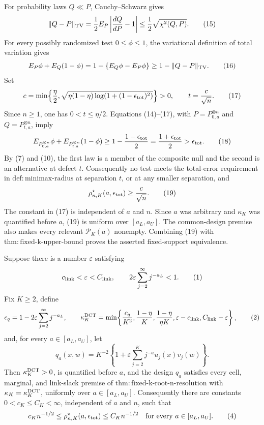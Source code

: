 For probability laws \(Q\ll P\), Cauchy--Schwarz gives
\[
\|Q-P\|_{\rm TV}
=\frac12E_P\left|\frac{dQ}{dP}-1\right|
\le\frac12\sqrt{\chi^2(Q,P)}.
\tag{15}
\]
For every possibly randomized test \(0\le\phi\le1\), the variational definition of total variation gives
\[
E_P\phi+E_Q(1-\phi)
=1-\{E_Q\phi-E_P\phi\}
\ge1-\|Q-P\|_{\rm TV}.
\tag{16}
\]
Set
\[
c=\min\!\left\{\frac\eta2,
\sqrt{\eta(1-\eta)\log\!\left(1+(1-\epsilon_{\rm tot})^2\right)}\right\}>0,
\qquad
t=\frac{c}{\sqrt n}.
\tag{17}
\]
Since \(n\ge1\), one has \(0<t\le\eta/2\). Equations (14)--(17), with \(P=P_{0,a}^{\otimes n}\) and \(Q=P_{t,a}^{\otimes n}\), imply
\[
E_{P_{0,a}^{\otimes n}}\phi+E_{P_{t,a}^{\otimes n}}(1-\phi)
\ge1-\frac{1-\epsilon_{\rm tot}}2
=\frac{1+\epsilon_{\rm tot}}2
>\epsilon_{\rm tot}.
\tag{18}
\]
By (7) and (10), the first law is a member of the composite null and the second is an alternative at defect \(t\). Consequently no test meets the total-error requirement in \(\mathrm{def:minimax\mbox{-}radius}\) at separation \(t\), or at any smaller separation, and
\[
\rho^\star_{n,K}(a,\epsilon_{\rm tot})\ge\frac{c}{\sqrt n}.
\tag{19}
\]
The constant in (17) is independent of \(a\) and \(n\). Since \(a\) was arbitrary and \(\kappa_K\) was quantified before \(a\), (19) is uniform over \([a_L,a_U]\). The common-design premise also makes every relevant \(\mathcal P_K(a)\) nonempty. Combining (19) with \(\mathrm{thm:fixed\mbox{-}k\mbox{-}upper\mbox{-}bound}\) proves the asserted fixed-support equivalence.

Suppose there is a number \(\varepsilon\) satisfying
\[
c_{\rm link}<\varepsilon<C_{\rm link},
\qquad
2\varepsilon\sum_{j=2}^{\infty}j^{-a_L}<1.
\tag{1}
\]
Fix \(K\ge2\), define
\[
c_q=1-2\varepsilon\sum_{j=2}^{\infty}j^{-a_L},
\qquad
\kappa_K^{\rm DCT}
=\min\!\left\{
\frac{c_q}{K^2},
\frac{1-\eta}{K},
\frac{1-\eta}{\eta K},
\varepsilon-c_{\rm link},
C_{\rm link}-\varepsilon
\right\},
\tag{2}
\]
and, for every \(a\in[a_L,a_U]\), let
\[
q_a(x,w)=K^{-2}\left\{1+\varepsilon\sum_{j=2}^Kj^{-a}u_j(x)v_j(w)\right\}.
\tag{3}
\]
Then \(\kappa_K^{\rm DCT}>0\), is quantified before \(a\), and the design \(q_a\) satisfies every cell, marginal, and link-slack premise of \(\mathrm{thm:fixed\mbox{-}k\mbox{-}root\mbox{-}n\mbox{-}resolution}\) with \(\kappa_K=\kappa_K^{\rm DCT}\), uniformly over \(a\in[a_L,a_U]\). Consequently there are constants \(0<c_K\le C_K<\infty\), independent of \(a\) and \(n\), such that
\[
c_Kn^{-1/2}
\le \rho^\star_{n,K}(a,\epsilon_{\rm tot})
\le C_Kn^{-1/2}
\quad\text{for every }a\in[a_L,a_U].
\tag{4}
\]

